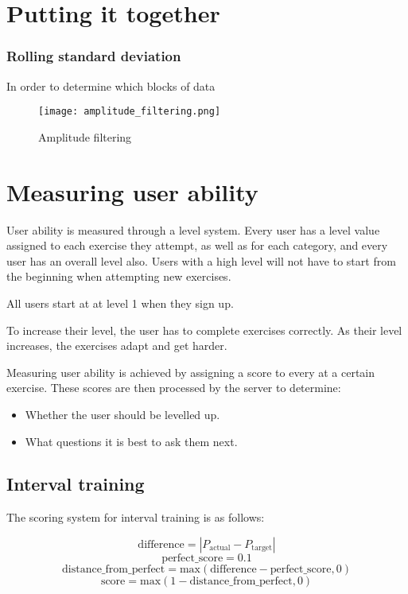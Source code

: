 \section{Putting it together}
\subsubsection{Rolling standard deviation}
In order to determine which blocks of data


\begin{figure}
	\centering
    \texttt{[image: amplitude\_filtering.png]}
	\caption{Amplitude filtering}
\end{figure}
\section{Measuring user ability}

User ability is measured through a level system. Every user has a level value assigned to each exercise they attempt, as well as for each category, and every user has an overall level also. Users with a high level will not have to start from the beginning when attempting new exercises. 

All users start at at level 1 when they sign up.

To increase their level, the user has to complete exercises correctly. As their level increases, the exercises adapt and get harder.

Measuring user ability is achieved by assigning a score to every  at a certain exercise. These scores are then processed by the server to determine:
	\begin{itemize}
		\item Whether the user should be levelled up.
		\item What questions it is best to ask them next.
	\end{itemize}

\subsection{Interval training}

The scoring system for interval training is as follows:

\[\text{difference} = |P_\text{actual}- P_\text{target}|\]
\[\text{perfect\_score} = 0.1 \]
\[\text{distance\_from\_perfect} = \text{max}(\text{difference}-\text{perfect\_score},0)\]
\[\text{score} = \text{max}(1 - \text{distance\_from\_perfect},0)\]

